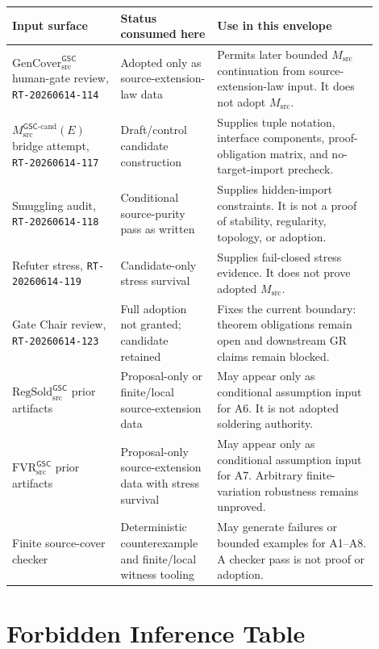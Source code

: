 \documentclass[11pt]{article}
\newcommand{\GSC}{\mathsf{GSC}}
\newcommand{\Msrc}{M_{\mathrm{src}}}
\newcommand{\Mgsccand}{M_{\mathrm{src}}^{\GSC\mbox{-}\mathrm{cand}}}
\newcommand{\GenCover}{\mathrm{GenCover}_{\mathrm{src}}^{\GSC}}
\newcommand{\FVR}{\mathrm{FVR}_{\mathrm{src}}^{\GSC}}
\newcommand{\RegSold}{\mathrm{RegSold}_{\mathrm{src}}^{\GSC}}
\begin{document}
\begin{longtable}{|p{0.27\linewidth}|p{0.23\linewidth}|p{0.40\linewidth}|}
\hline
\textbf{Input surface} & \textbf{Status consumed here} & \textbf{Use in this envelope} \\
\hline
\(\GenCover\) human-gate review, \texttt{RT-20260614-114} & Adopted only as source-extension-law data & Permits later bounded \(\Msrc\) continuation from source-extension-law input. It does not adopt \(\Msrc\). \\
\hline
\(\Mgsccand(E)\) bridge attempt, \texttt{RT-20260614-117} & Draft/control candidate construction & Supplies tuple notation, interface components, proof-obligation matrix, and no-target-import precheck. \\
\hline
Smuggling audit, \texttt{RT-20260614-118} & Conditional source-purity pass as written & Supplies hidden-import constraints. It is not a proof of stability, regularity, topology, or adoption. \\
\hline
Refuter stress, \texttt{RT-20260614-119} & Candidate-only stress survival & Supplies fail-closed stress evidence. It does not prove adopted \(\Msrc\). \\
\hline
Gate Chair review, \texttt{RT-20260614-123} & Full adoption not granted; candidate retained & Fixes the current boundary: theorem obligations remain open and downstream GR claims remain blocked. \\
\hline
\(\RegSold\) prior artifacts & Proposal-only or finite/local source-extension data & May appear only as conditional assumption input for A6. It is not adopted soldering authority. \\
\hline
\(\FVR\) prior artifacts & Proposal-only source-extension data with stress survival & May appear only as conditional assumption input for A7. Arbitrary finite-variation robustness remains unproved. \\
\hline
Finite source-cover checker & Deterministic counterexample and finite/local witness tooling & May generate failures or bounded examples for A1--A8. A checker pass is not proof or adoption. \\
\hline
\end{longtable}

\section{Forbidden Inference Table}
\end{document}

